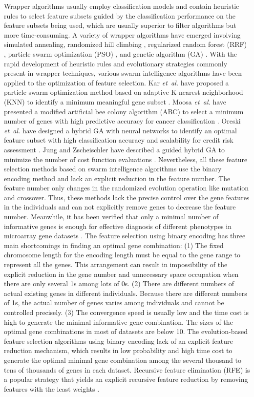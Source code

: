 \documentclass[10pt,journal,compsoc]{IEEEtran}
\begin{document}
	Wrapper algorithms usually employ classification models and contain heuristic rules to select feature subsets guided by the classification performance on the feature subsets being used, which are usually superior to filter algorithms but more time-consuming. A variety of wrapper algorithms have emerged involving simulated annealing, randomized hill climbing \cite{W26}, regularized random forest (RRF) \cite{W11}, particle swarm optimization (PSO) \cite{W12,W10}, and genetic algorithm (GA) \cite{W13}. With the rapid development of heuristic rules and evolutionary strategies commonly present in wrapper techniques, various swarm intelligence algorithms have been applied to the optimization of feature selection. Kar \emph{et~al.} have proposed a particle swarm optimization method based on adaptive K-nearest neighborhood (KNN) to identify a minimum meaningful gene subset \cite{W15}. Moosa \emph{et~al.} have presented a modified artificial bee colony algorithm (ABC) to select a minimum number of genes with high predictive accuracy for cancer classification \cite{P32}. Oreski \emph{et~al.} have designed a hybrid GA with neural networks to identify an optimal feature subset with high classification accuracy and scalability for credit risk assessment \cite{W17}. Jung and Zscheischler have described a guided hybrid GA to minimize the number of cost function evaluations \cite{W18}. Nevertheless, all these feature selection methods based on swarm intelligence algorithms use the binary encoding method and lack an explicit reduction in the feature number. The feature number only changes in the randomized evolution operation like mutation and crossover. Thus, these methods lack the precise control over the gene features in the individuals and can not explicitly remove genes to decrease the feature number. Meanwhile, it has been verified that only a minimal number of informative genes is enough for effective diagnosis of different phenotypes in microarray gene datasets \cite{P1,W16,P32,P33}. The feature selection using binary encoding has three main shortcomings in finding an optimal gene combination: (1) The fixed chromosome length for the encoding length must be equal to the gene range to represent all the genes. This arrangement can result in impossibility of the explicit reduction in the gene number and unnecessary space occupation when there are only several 1s among lots of 0s. (2) There are different numbers of actual existing genes in different individuals. Because there are different numbers of 1s, the actual number of genes varies among individuals and cannot be controlled precisely. (3) The convergence speed is usually low and the time cost is high to generate the minimal informative gene combination. 
	The sizes of the optimal gene combinations in most of datasets are below 10. The evolution-based feature selection algorithms using binary encoding lack of an explicit feature reduction mechanism, which results in low probability and high time cost to generate the optimal minimal gene combination among the several thousand to tens of thousands of genes in each dataset.
	Recursive feature elimination (RFE) is a popular strategy that yields an explicit recursive feature reduction by removing features with the least weights \cite{W7,P1,P2,P27}.
	
\end{document}
